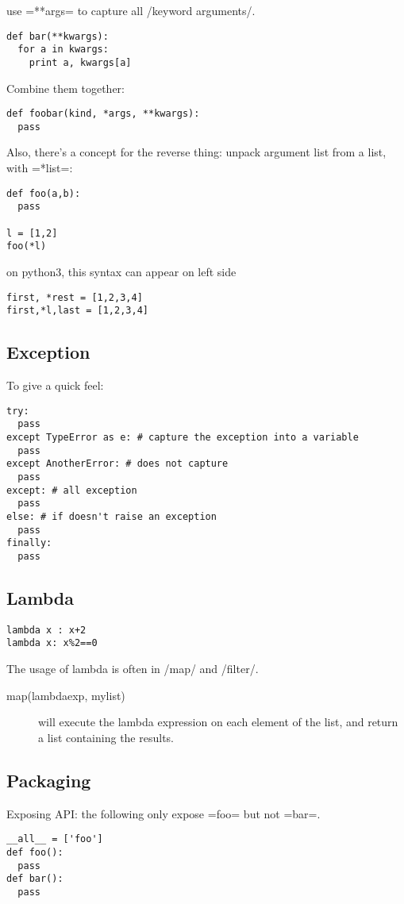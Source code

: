 use =**args= to capture all /keyword arguments/.

\begin{lstlisting}
def bar(**kwargs):
  for a in kwargs:
    print a, kwargs[a]
\end{lstlisting}

Combine them together:
\begin{lstlisting}
def foobar(kind, *args, **kwargs):
  pass
\end{lstlisting}

Also, there's a concept for the reverse thing: unpack argument list from a list, with =*list=:
\begin{lstlisting}
def foo(a,b):
  pass

l = [1,2]
foo(*l)
\end{lstlisting}

on python3, this syntax can appear on left side
\begin{lstlisting}
first, *rest = [1,2,3,4]
first,*l,last = [1,2,3,4]
\end{lstlisting}

\subsection{Exception}
To give a quick feel:
\begin{lstlisting}
try:
  pass
except TypeError as e: # capture the exception into a variable
  pass
except AnotherError: # does not capture
  pass
except: # all exception
  pass
else: # if doesn't raise an exception
  pass
finally:
  pass
\end{lstlisting}

\subsection{Lambda}
\begin{lstlisting}
lambda x : x+2
lambda x: x%2==0
\end{lstlisting}

The usage of lambda is often in /map/ and /filter/.
\begin{description}
\item [map(lambdaexp, mylist)] will execute the lambda expression on
  each element of the list, and return a list containing the results.
\end{description}

\subsection{Packaging}
Exposing API: the following only expose =foo= but not =bar=.
\begin{lstlisting}
__all__ = ['foo']
def foo():
  pass
def bar():
  pass
\end{lstlisting}

